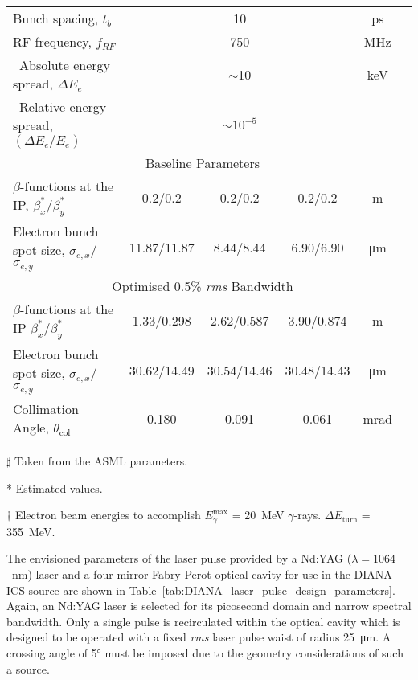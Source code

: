\documentclass[../main.tex]{subfiles}
\begin{document}
\begin{table}[H]
\begin{threeparttable}
\begin{tabular}{lccccc}
Bunch spacing, $t_{b}$ & \multicolumn{3}{c}{10} & \si{\pico\second} \\
RF frequency, $f_{RF}$ & \multicolumn{3}{c}{750} & \si{\mega\hertz} \\
\tnote{*}~Absolute energy spread, $\Delta E_{e}$ & \multicolumn{3}{c}{$\sim$10} & \si{\kilo\electronvolt} \\ 
\tnote{*}~Relative energy spread, $\left(\Delta E_{e}/E_{e}\right)$ & \multicolumn{3}{c}{$\sim10^{-5}$} & \\
\hline
\multicolumn{5}{c}{Baseline Parameters} \\
\hline
$\beta$-functions at the IP, $\beta_{x}^{*}$/$\beta_{y}^{*}$ & 0.2/0.2 & 0.2/0.2 & 0.2/0.2 & \si{\meter} \\
Electron bunch spot size, $\sigma_{e,x}$/$\sigma_{e,y}$ & 11.87/11.87 & 8.44/8.44 & 6.90/6.90 & \si{\micro\meter}\\
\hline\multicolumn{5}{c}{Optimised 0.5\% \textit{rms} Bandwidth} \\
\hline
$\beta$-functions at the IP $\beta_{x}^{*}$/$\beta_{y}^{*}$ & 1.33/0.298 & 2.62/0.587 & 3.90/0.874 & \si{\meter} \\
Electron bunch spot size, $\sigma_{e,x}$/$\sigma_{e,y}$ & 30.62/14.49 & 30.54/14.46 & 30.48/14.43 & \si{\micro\meter}\\
Collimation Angle, $\theta_{\mathrm{col}}$ & 0.180 & 0.091 & 0.061 & \si{\milli\radian} \\ 
\hline\hline
\end{tabular}
\begin{tablenotes}
\item[$\sharp$]{Taken from the ASML parameters.}
\item[*]{Estimated values.}
\item[$\dagger$]{Electron beam energies to accomplish $E_{\gamma}^{\mathrm{max}}$ = 20~\si{\mega\electronvolt} $\gamma$-rays. $\Delta E_{\mathrm{turn}}$ = 355~\si{\mega\electronvolt}.}
\end{tablenotes}
\end{threeparttable}
\label{tab:DIANA_electron_beam_design_parameters}
\end{table}

The envisioned parameters of the laser pulse provided by a Nd:YAG ($\lambda = 1064$~\si{\nano\meter}) laser and a four mirror Fabry-Perot optical cavity for use in the DIANA ICS source are shown in Table~\ref{tab:DIANA_laser_pulse_design_parameters}. Again, an Nd:YAG laser is selected for its picosecond domain and narrow spectral bandwidth. Only a single pulse is recirculated within the optical cavity which is designed to be operated with a fixed \textit{rms} laser pulse waist of radius 25~\si{\micro\meter}. A crossing angle of 5\si{\degree} must be imposed due to the geometry considerations of such a source.
\end{document}
